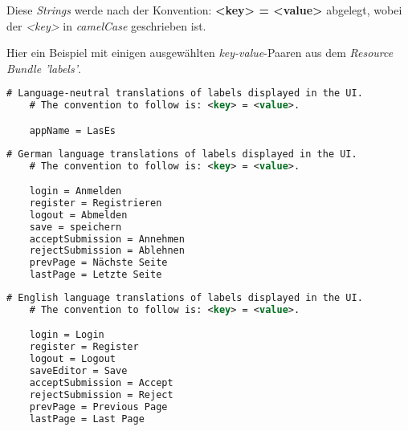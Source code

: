 Diese \emph{Strings} werde nach der Konvention:
\textbf{<key> = <value>}
abgelegt, wobei der \emph{<key>} in \emph{camelCase} geschrieben ist.

Hier ein Beispiel mit einigen ausgewählten \emph{key-value}-Paaren aus
dem \emph{Resource Bundle 'labels'}.
\begin{lstlisting}[language=XML, caption = Beispielhafter Ausschnitt aus \emph{label.properties}]
    # Language-neutral translations of labels displayed in the UI.
    # The convention to follow is: <key> = <value>.

    appName = LasEs
\end{lstlisting}
\begin{lstlisting}[language=XML, caption = Beispielhafter Ausschnitt aus \emph{label\_de.properties}]
    # German language translations of labels displayed in the UI.
    # The convention to follow is: <key> = <value>.

    login = Anmelden
    register = Registrieren
    logout = Abmelden
    save = speichern
    acceptSubmission = Annehmen
    rejectSubmission = Ablehnen
    prevPage = Nächste Seite
    lastPage = Letzte Seite
\end{lstlisting}

\begin{lstlisting}[language=XML, caption = Beispielhafter Ausschnitt aus \emph{label\_en.properties}]
    # English language translations of labels displayed in the UI.
    # The convention to follow is: <key> = <value>.

    login = Login
    register = Register
    logout = Logout
    saveEditor = Save
    acceptSubmission = Accept
    rejectSubmission = Reject
    prevPage = Previous Page
    lastPage = Last Page
\end{lstlisting}